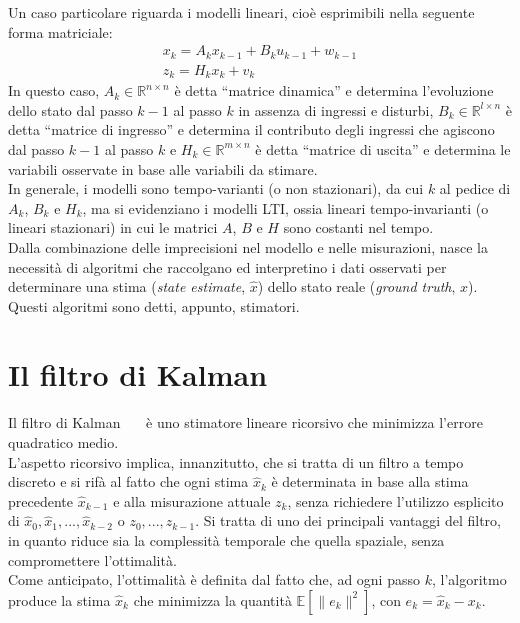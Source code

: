 \documentclass[12pt,a4paper,openright,twoside]{book}
\begin{document}
Un caso particolare riguarda i modelli lineari, cioè esprimibili nella seguente forma matriciale:
\begin{gather}
x_k=A_kx_{k-1}+B_ku_{k-1}+w_{k-1} \label{eq:transition}\\
z_k=H_kx_k+v_k \label{eq:output}
\end{gather}
In questo caso, $A_k\in\mathbb{R}^{n\times n}$ è detta ``matrice dinamica'' e determina l'evoluzione dello stato dal passo $k-1$ al passo $k$ in assenza di ingressi e disturbi, $B_k\in\mathbb{R}^{l\times n}$ è detta ``matrice di ingresso'' e determina il contributo degli ingressi che agiscono dal passo $k-1$ al passo $k$ e $H_k\in\mathbb{R}^{m\times n}$ è detta ``matrice di uscita'' e determina le variabili osservate in base alle variabili da stimare. \\

In generale, i modelli sono tempo-varianti (o non stazionari), da cui $k$ al pedice di $A_k$, $B_k$ e $H_k$, ma si evidenziano i modelli LTI, ossia lineari tempo-invarianti (o lineari stazionari) in cui le matrici $A$, $B$ e $H$ sono costanti nel tempo. \\

Dalla combinazione delle imprecisioni nel modello e nelle misurazioni, nasce la necessità di algoritmi che raccolgano ed interpretino i dati osservati per determinare una stima (\textit{state estimate}, $\hat{x}$) dello stato reale (\textit{ground truth}, $x$). Questi algoritmi sono detti, appunto, stimatori.

\section{Il filtro di Kalman}

Il filtro di Kalman~\cite{10.1115/1.3662552}~\cite{WelchB95}~\cite{10.1145/3363294} è uno stimatore lineare ricorsivo che minimizza l'errore quadratico medio. \\
L'aspetto ricorsivo implica, innanzitutto, che si tratta di un filtro a tempo discreto e si rifà al fatto che ogni stima $\hat{x}_k$ è determinata in base alla stima precedente $\hat{x}_{k-1}$ e alla misurazione attuale $z_k$, senza richiedere l'utilizzo esplicito di $\hat{x}_0,\hat{x}_1,...,\hat{x}_{k-2}$ o $z_0,...,z_{k-1}$. Si tratta di uno dei principali vantaggi del filtro, in quanto riduce sia la complessità temporale che quella spaziale, senza compromettere l'ottimalità. \\
Come anticipato, l'ottimalità è definita dal fatto che, ad ogni passo $k$, l'algoritmo produce la stima $\hat{x}_k$ che minimizza la quantità $\mathbb{E}[\lVert e_k\rVert^2]$, con $e_k=\hat{x}_k-x_k$. \\
\end{document}
